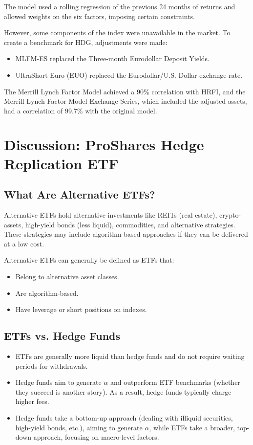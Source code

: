 \documentclass{article}
\begin{document}
The model used a rolling regression of the previous 24 months of returns and allowed weights on the six factors, imposing certain constraints.

However, some components of the index were unavailable in the market. To create a benchmark for HDG, adjustments were made:
\begin{itemize}
    \item MLFM-ES replaced the Three-month Eurodollar Deposit Yields.
    \item UltraShort Euro (EUO) replaced the Eurodollar/U.S. Dollar exchange rate.
\end{itemize}

The Merrill Lynch Factor Model achieved a 90\% correlation with HRFI, and the Merrill Lynch Factor Model Exchange Series, which included the adjusted assets, had a correlation of 99.7\% with the original model.

\section{Discussion: ProShares Hedge Replication ETF}
\subsection{What Are Alternative ETFs?}
Alternative ETFs hold alternative investments like REITs (real estate), crypto-assets, high-yield bonds (less liquid), commodities, and alternative strategies. These strategies may include algorithm-based approaches if they can be delivered at a low cost.

Alternative ETFs can generally be defined as ETFs that:
\begin{itemize}
    \item Belong to alternative asset classes.
    \item Are algorithm-based.
    \item Have leverage or short positions on indexes.
\end{itemize}

\subsection{ETFs vs. Hedge Funds}
\begin{itemize}
    \item ETFs are generally more liquid than hedge funds and do not require waiting periods for withdrawals.
    \item Hedge funds aim to generate $\alpha$ and outperform ETF benchmarks (whether they succeed is another story). As a result, hedge funds typically charge higher fees.
    \item Hedge funds take a bottom-up approach (dealing with illiquid securities, high-yield bonds, etc.), aiming to generate $\alpha$, while ETFs take a broader, top-down approach, focusing on macro-level factors.
\end{itemize}
\end{document}
